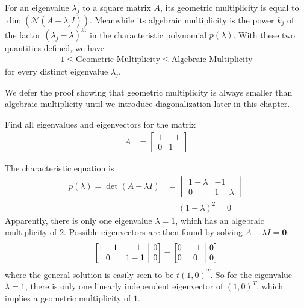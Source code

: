 \begin{thm}
\label{thm:geolessalgebra}
For an eigenvalue $\lambda_j$ to a square matrix $A$, its geometric multiplicity is equal to $\dim(\mathcal{N}(A-\lambda_j I))$. Meanwhile its algebraic multiplicity is the power $k_j$ of the factor $(\lambda_j - \lambda)^{k_j}$ in the characteristic polynomial $p(\lambda)$. With these two quantities defined, we have
\begin{align*}
1 \leq \text{Geometric Multiplicity} \leq \text{Algebraic Multiplicity}
\end{align*}
for every distinct eigenvalue $\lambda_j$.
\end{thm}
We defer the proof showing that geometric multiplicity is always smaller than algebraic multiplicity until we introduce diagonalization later in this chapter.

\begin{exmp}
\label{exmp:dummyjordan}
Find all eigenvalues and eigenvectors for the matrix
\begin{align*}
A &=
\begin{bmatrix}
1 & -1 \\
0 & 1
\end{bmatrix}
\end{align*}
\end{exmp}
\begin{solution}
The characteristic equation is
\begin{align*}
p(\lambda) = \det(A - \lambda I) &= 
\begin{vmatrix}
1-\lambda & -1 \\
0 & 1-\lambda
\end{vmatrix} \\
&= (1-\lambda)^2 = 0
\end{align*}
Apparently, there is only one eigenvalue $\lambda = 1$, which has an algebraic multiplicity of $2$. Possible eigenvectors are then found by solving $A-\lambda I = \textbf{0}$:
\begin{align*}
\left[\begin{array}{@{}cc|c@{}}
1-1 & -1 & 0 \\
0 & 1-1 & 0
\end{array}\right] 
= 
\left[\begin{array}{@{}cc|c@{}}
0 & -1 & 0 \\
0 & 0 & 0
\end{array}\right]
\end{align*}
where the general solution is easily seen to be $t(1,0)^T$. So for the eigenvalue $\lambda = 1$, there is only one linearly independent eigenvector of $(1,0)^T$, which implies a geometric multiplicity of $1$.
\end{solution}

